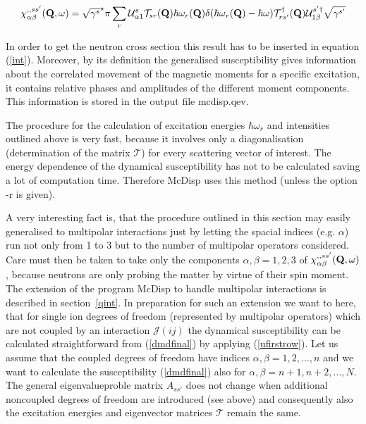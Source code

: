 \begin{equation}\label{dmdfinal}
\chi^{,,ss'}_{\alpha\beta}(\mbf Q,\omega)=\sqrt{\gamma^s}^\star\pi \sum_r 
\mathcal U^s_{\alpha1} \mathcal T_{sr}(\mbf Q) \hbar\omega_r(\mbf Q)\delta(\hbar \omega_r(\mbf Q) %
- \hbar \omega) \mathcal T^{\dag}_{rs'}(\mbf Q) \mathcal U^{s'\dag}_{1\beta}\sqrt{\gamma^{s'}} 
\end{equation}

In order to get the neutron cross section this result has to be inserted in equation (\ref{int}).
Moreover, by its definition the generalised susceptibility gives information about the correlated
movement of the magnetic moments for a specific excitation, it contains relative phases and amplitudes of the 
different moment components. This information is stored in the output file {\prg mcdisp.qev}.

The procedure for the calculation of excitation energies $\hbar\omega_r$ and intensities outlined above is very fast, %
because it
involves only a diagonalisation (determination of the matrix $\mathcal T$) for every scattering vector of interest. The 
energy dependence of the dynamical susceptibility has not to be calculated saving a lot of computation time. Therefore %
{\prg McDisp}
uses this method (unless the option {\prg -r} is given).

A very interesting fact is, that the procedure outlined in this section may easily generalised to multipolar %
interactions just by
letting the spacial indices (e.g. $\alpha$) run not only from 1 to 3 but to the number of multipolar operators %
considered. 
Care must then be taken to take only the components $\alpha,\beta=1,2,3$ of $\chi^{,,ss'}_{\alpha\beta}(\mathbf Q,\omega)$, %
because
neutrons are only probing the matter by virtue of their spin moment. The extension of the program {\prg McDisp} to %
handle
multipolar interactions is described in section~\ref{qint}. In preparation for such an extension we want to here, that
for single ion degrees of freedom (represented by multipolar operators)
 which are not coupled by an interaction $\mathcal J(ij)$ the dynamical susceptibility can be calculated straightforward
from (\ref{dmdfinal}) by applying (\ref{ufirstrow}). Let us assume that the coupled degrees of freedom
have indices $\alpha,\beta=1,2,...,n$ and we want to calculate the susceptibility (\ref{dmdfinal})
 also for $\alpha,\beta=n+1,n+2,...,N$. The general eigenvalueproble matrix $A_{ss'}$
does not change when additional noncoupled degrees of freedom are introduced (see above) and consequently also
the excitation energies and eigenvector matrices $\mathcal T$ remain the same. 


